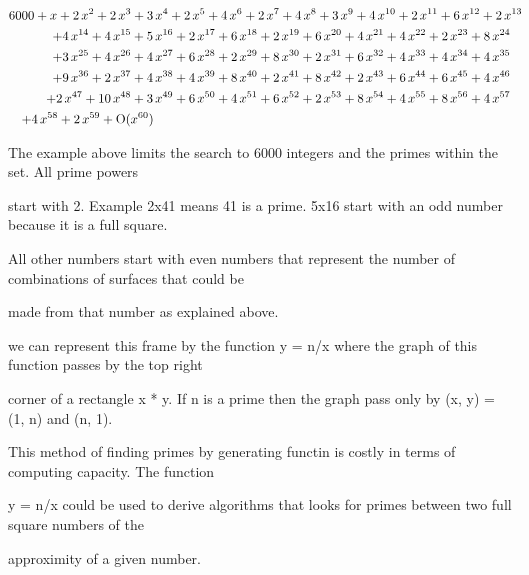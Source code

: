 \documentclass{article}
\begin{document}
\begin{maplegroup}
\begin{mapleinput}
\end{mapleinput}

\mapleresult
\begin{maplelatex}
\begin{eqnarray*}
\lefteqn{6000 + x + 2\,x^{2} + 2\,x^{3} + 3\,x^{4} + 2\,x^{5} + 4
\,x^{6} + 2\,x^{7} + 4\,x^{8} + 3\,x^{9} + 4\,x^{10} + 2\,x^{11}
 + 6\,x^{12} + 2\,x^{13}} \\
 & &  + 4\,x^{14} + 4\,x^{15} + 5\,x^{16} + 2\,x^{17} + 6\,x^{18}
 + 2\,x^{19} + 6\,x^{20} + 4\,x^{21} + 4\,x^{22} + 2\,x^{23} + 8
\,x^{24} \\
 & &  + 3\,x^{25} + 4\,x^{26} + 4\,x^{27} + 6\,x^{28} + 2\,x^{29}
 + 8\,x^{30} + 2\,x^{31} + 6\,x^{32} + 4\,x^{33} + 4\,x^{34} + 4
\,x^{35} \\
 & &  + 9\,x^{36} + 2\,x^{37} + 4\,x^{38} + 4\,x^{39} + 8\,x^{40}
 + 2\,x^{41} + 8\,x^{42} + 2\,x^{43} + 6\,x^{44} + 6\,x^{45} + 4
\,x^{46} \\
 & &  + 2\,x^{47} + 10\,x^{48} + 3\,x^{49} + 6\,x^{50} + 4\,x^{51
} + 6\,x^{52} + 2\,x^{53} + 8\,x^{54} + 4\,x^{55} + 8\,x^{56} + 4
\,x^{57} \\
 & &  + 4\,x^{58} + 2\,x^{59} + \mathrm{O}(x^{60})
\mbox{\hspace{280pt}}
\end{eqnarray*}
\end{maplelatex}

\end{maplegroup}
\begin{maplegroup}
The example above limits the search to 6000 integers and the primes
within the set.  All prime powers

start with 2. Example 2x41 means 41 is a prime.
5x16 start with an odd number because it is a full square.

All other numbers start with even numbers that represent the number of
combinations of surfaces that could be

made from that number as explained above.

we can represent this frame by the function y = n/x where the graph of
this function passes by the top right 

corner of a rectangle x * y.  If n is a prime then the graph pass only
by (x, y) = (1, n) and (n, 1).

This method of finding primes by generating functin is costly in terms
of computing capacity.  The function

y = n/x could be used to derive algorithms that looks for primes
between two full square numbers of the 

approximity of a given number.

\end{maplegroup}
\end{document}
